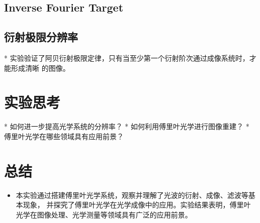 \documentclass{ctexart}
\begin{document}
\subsection{Inverse Fourier Target}
\subsection{衍射极限分辨率}
* 实验验证了阿贝衍射极限定律，只有当至少第一个衍射阶次通过成像系统时，才能形成清晰
的图像。


\section{实验思考}
* 如何进一步提高光学系统的分辨率？
* 如何利用傅里叶光学进行图像重建？
* 傅里叶光学在哪些领域具有应用前景？

\section{总结}
\begin{itemize}
  \item 本实验通过搭建傅里叶光学系统，观察并理解了光波的衍射、成像、滤波等基本现象，
  并探究了傅里叶光学在光学成像中的应用。实验结果表明，傅里叶光学在图像处理、光学测量等领域具有广泛的应用前景。

\end{itemize}
\end{document}
